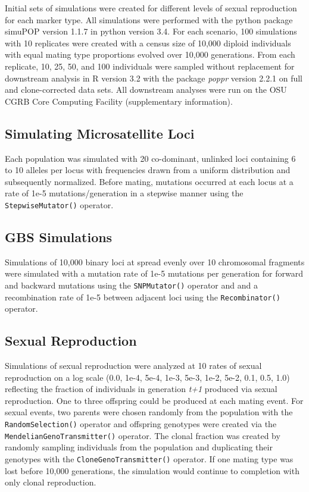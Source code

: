\documentclass[double,12pt]{beavtex}
\begin{document}
  Initial sets of simulations were created for different levels of sexual
  reproduction for each marker type. All simulations were performed with
  the python package simuPOP version 1.1.7 in python version 3.4. For each
  scenario, 100 simulations with 10 replicates were created with a census
  size of 10,000 diploid individuals with equal mating type proportions
  evolved over 10,000 generations. From each replicate, 10, 25, 50, and
  100 individuals were sampled without replacement for downstream analysis
  in R version 3.2 with the package \emph{poppr} version 2.2.1 on full and
  clone-corrected data sets. All downstream analyses were run on the OSU
  CGRB Core Computing Facility (supplementary information).
  
  \subsection{Simulating Microsatellite
  Loci}\label{simulating-microsatellite-loci}
  
  Each population was simulated with 20 co-dominant, unlinked loci
  containing 6 to 10 alleles per locus with frequencies drawn from a
  uniform distribution and subsequently normalized. Before mating,
  mutations occurred at each locus at a rate of 1e-5 mutations/generation
  in a stepwise manner using the \texttt{StepwiseMutator()} operator.
  
  \subsection{GBS Simulations}\label{gbs-simulations}
  
  Simulations of 10,000 binary loci at spread evenly over 10 chromosomal
  fragments were simulated with a mutation rate of 1e-5 mutations per
  generation for forward and backward mutations using the
  \texttt{SNPMutator()} operator and and a recombination rate of 1e-5
  between adjacent loci using the \texttt{Recombinator()} operator.
  
  \subsection{Sexual Reproduction}\label{sexual-reproduction}
  
  Simulations of sexual reproduction were analyzed at 10 rates of sexual
  reproduction on a log scale (0.0, 1e-4, 5e-4, 1e-3, 5e-3, 1e-2, 5e-2,
  0.1, 0.5, 1.0) reflecting the fraction of individuals in generation
  \emph{t+1} produced via sexual reproduction. One to three offspring
  could be produced at each mating event. For sexual events, two parents
  were chosen randomly from the population with the
  \texttt{RandomSelection()} operator and offspring genotypes were created
  via the \texttt{MendelianGenoTransmitter()} operator. The clonal
  fraction was created by randomly sampling individuals from the
  population and duplicating their genotypes with the
  \texttt{CloneGenoTransmitter()} operator. If one mating type was lost
  before 10,000 generations, the simulation would continue to completion
  with only clonal reproduction.
  
\end{document}
